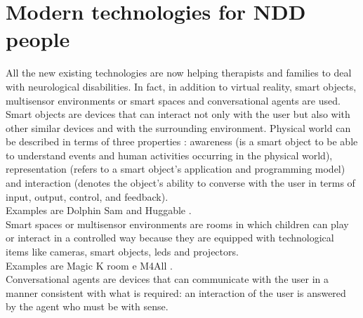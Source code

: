\section{Modern technologies for NDD people}
All the new existing technologies are now helping therapists and families to deal with neurological disabilities. In fact, in addition to virtual reality, smart objects, multisensor environments or smart spaces and conversational agents are used.\\
Smart objects are devices that can interact not only with the user but also with other similar devices and with the surrounding environment. Physical world can be described in terms of three properties \cite{Smart}: awareness (is a smart object to be able to understand events and human activities occurring in the physical world), representation (refers to a smart object's application and programming model) and interaction (denotes the object's ability to converse with the user in terms of input, output, control, and feedback).\\
Examples are Dolphin Sam \cite{Dolphin} and  Huggable \cite{Huggable}. \\
Smart spaces or multisensor environments are rooms in which children can play or interact in a controlled way because they are equipped with technological items like cameras, smart objects, leds and projectors.
\\
Examples are Magic K room e M4All \cite{M4all}. \\
Conversational agents are devices that can communicate with the user in a manner consistent with what is required: an interaction of the user is answered by the agent who must be with sense.\\
